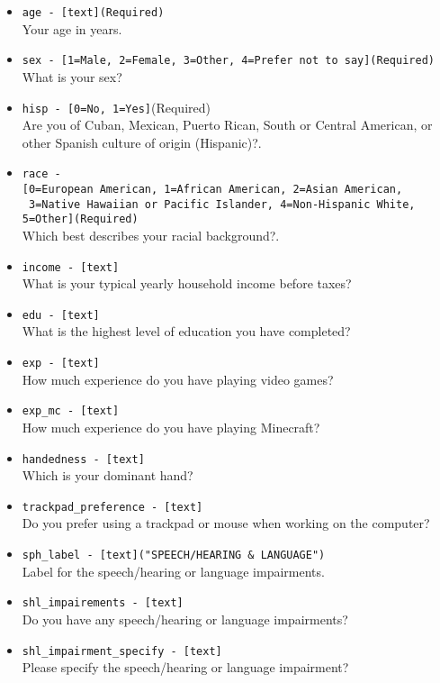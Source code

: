 \begin{description}
\begin{addmargin}[0em]{0em}
\begin{addmargin}[1em]{0em}
\begin{itemize}
            \item \verb|age - [text](Required)|\\Your age in years.
            \item \verb|sex - [1=Male, 2=Female, 3=Other, 4=Prefer not to say](Required)|\\What is your sex?
            \item \verb|hisp - [0=No, 1=Yes]|(Required)\\Are you of Cuban, Mexican, Puerto Rican, South or Central American, or other Spanish culture of origin (Hispanic)?.
            \item \verb|race -|\\\verb|[0=European American, 1=African American, 2=Asian American,|\\\verb| 3=Native Hawaiian or Pacific Islander, 4=Non-Hispanic White, 5=Other](Required)|\\Which best describes your racial background?.
            \item \verb|income - [text]|\\What is your typical yearly household income before taxes?
            \item \verb|edu - [text]|\\What is the highest level of education you have completed?
            \item \verb|exp - [text]|\\How much experience do you have playing video games?
            \item \verb|exp_mc - [text]|\\How much experience do you have playing Minecraft?
            \item \verb|handedness - [text]|\\Which is your dominant hand?
            \item \verb|trackpad_preference - [text]|\\Do you prefer using a trackpad or mouse when working on the computer?
            \item \verb|sph_label - [text]("SPEECH/HEARING & LANGUAGE")|\\Label for the speech/hearing or language impairments.
            \item \verb|shl_impairements - [text]|\\Do you have any speech/hearing or language impairments?
            \item \verb|shl_impairment_specify - [text]|\\Please specify the speech/hearing or language impairment?

\end{itemize}
\end{addmargin}
\end{addmargin}
\end{description}
